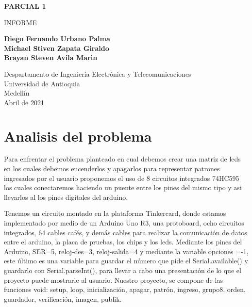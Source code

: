 \documentclass{article}
\begin{document}
\begin{titlepage}
    \begin{center}
        \vspace*{1cm}
            
        \Huge
        \textbf{PARCIAL 1}
            
        \vspace{0.5cm}
        \LARGE
        INFORME
            
        \vspace{1.5cm}
            
        \textbf{Diego Fernando Urbano Palma\\Michael Stiven Zapata Giraldo\\Brayan Steven Avila Marin}
            
        \vfill
            
        \vspace{0.8cm}
            
        \Large
        Despartamento de Ingeniería Electrónica y Telecomunicaciones\\
        Universidad de Antioquia\\
        Medellín\\
        Abril de 2021
            
    \end{center}
\end{titlepage}

\tableofcontents
\newpage
\section{ Analisis del problema }\label{intro}
Para enfrentar el problema planteado en cual debemos crear una matriz de leds en los cuales debemos encenderlos y apagarlos para representar patrones ingresados por el usuario proponemos el uso de 8 circuitos integrados 74HC595 los cuales conectaremos haciendo un puente entre los pines del mismo tipo y asi llevarlos al los pines digitales del arduino.

Tenemos un circuito montado en la plataforma Tinkercard, donde estamos implementado por medio de un Arduino Uno R3, una protoboard, ocho circuitos integrados, 64 cables cafés, y demás cables para realizar la comunicación de datos entre el arduino, la placa de pruebas, los chips y los leds. Mediante los pines del Arduino, SER=5, reloj-des=3, reloj-salida=4 y  mediante la variable opciones =-1, este último es una variable para guardar el número que pide el Serial.available() y guardarlo con Serial.parseInt(), para llevar a cabo una presentación de lo que el proyecto puede mostrarle al usuario. 
Nuestro proyecto, se compone de las funciones void: setup, loop, inicialización, apagar, patrón, ingreso, grupo8, orden, guardador, verificación, imagen, publik.
\end{document}
